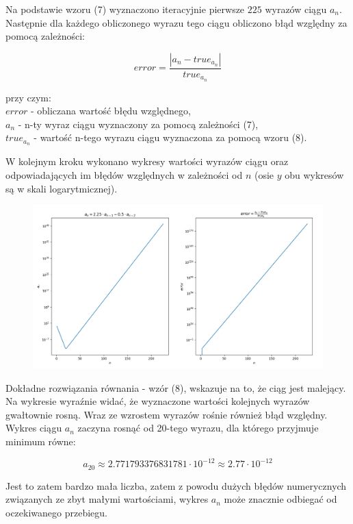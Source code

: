 \documentclass{article}
\begin{document}
	Na podstawie wzoru (7) wyznaczono iteracyjnie pierwsze $225$ wyrazów ciągu $a_n$. Następnie dla każdego obliczonego wyrazu tego ciągu obliczono błąd względny za pomocą zależności:
	
	\begin{equation}
		error = \frac{| a_n - true_{a_n} |}{true_{a_n}}
	\end{equation}
	
	przy czym: \\ 
	$error$ - obliczana wartość błędu względnego,  \\
	$a_n$ - n-ty wyraz ciągu wyznaczony za pomocą zależności (7), \\
	$true_{a_n}$ - wartość n-tego wyrazu ciągu wyznaczona za pomocą wzoru (8).
	\newline
	\newline
	
	W kolejnym kroku wykonano wykresy wartości wyrazów ciągu oraz odpowiadających im błędów względnych w zależności od $n$ (osie $y$ obu wykresów są w skali logarytmicznej).
	
	\begin{figure}[h]
    		\centering
  		\includegraphics[scale = 0.5]{zad2.png}
	\end{figure}
	
	Dokładne rozwiązania równania - wzór (8), wskazuje na to, że ciąg jest malejący. Na wykresie wyraźnie widać, że wyznaczone wartości kolejnych wyrazów gwałtownie rosną. Wraz ze wzrostem wyrazów rośnie również błąd względny. \newline \newline
	Wykres ciągu $a_n$ zaczyna rosnąć od 20-tego wyrazu, dla którego przyjmuje minimum równe:
	
	$$a_{20} \approx 2.771793376831781 \cdot 10^{-12} \approx 2.77 \cdot 10^{-12}$$
	
	Jest to zatem bardzo mała liczba, zatem z powodu dużych błędów numerycznych związanych ze zbyt małymi wartościami, wykres $a_n$ może znacznie odbiegać od oczekiwanego przebiegu.
	
	
	
	
	
	
	
	
	
	
	
	
	
	
	
	
	
	
	
	
	
	
	
	
	
	
	
	
	
	
	
\end{document}
